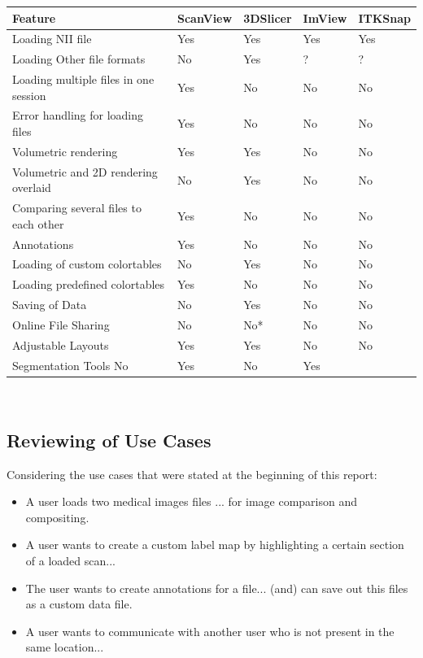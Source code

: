 \documentclass[a4paper,11pt,twoside]{article}
\begin{document}
\begin{center}

  \begin{tabular}{ | l | l | l | l | l |}
    \hline
    Feature & ScanView & 3DSlicer & ImView & ITKSnap \\ \hline \hline

Loading NII file & Yes & Yes & Yes & Yes\\ \hline
Loading Other file formats & No & Yes & ? & ?\\ \hline
Loading multiple files in one session & Yes & No & No & No \\ \hline
Error handling for loading files & Yes & No & No & No\\ \hline
Volumetric rendering & Yes & Yes & No & No\\ \hline
Volumetric and 2D rendering overlaid & No & Yes & No & No \\ \hline
Comparing several files to each other & Yes & No & No & No\\ \hline
Annotations & Yes & No & No & No\\ \hline
Loading of custom colortables & No & Yes & No & No \\ \hline
Loading predefined colortables & Yes & No & No & No\\ \hline
Saving of Data & No & Yes & No & No\\ \hline
Online File Sharing & No & No* & No & No\\ \hline
Adjustable Layouts & Yes & Yes & No & No \\ \hline
Segmentation Tools No & Yes & No & Yes \\ \hline

  \end{tabular}\\


\end{center}


\subsection{Reviewing of Use Cases}

Considering the use cases that were stated at the beginning of this report:

\begin{itemize}

\item A user loads two medical images files ... for image comparison and compositing.

\item A user wants to create a custom label map by highlighting a certain section of a loaded scan...

\item The user wants to create annotations for a file... (and) can save out this files as a custom data file.

\item A user wants to communicate with another user who is not present in the same location...
\end{itemize}
\end{document}
